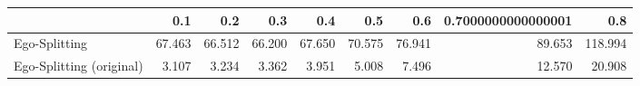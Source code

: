 \begin{tabular}{lrrrrrrrr}
\toprule
{} &    0.1 &    0.2 &    0.3 &    0.4 &    0.5 &    0.6 & 0.7000000000000001 &     0.8 \\
\midrule
Ego-Splitting            & 67.463 & 66.512 & 66.200 & 67.650 & 70.575 & 76.941 &             89.653 & 118.994 \\
Ego-Splitting (original) &  3.107 &  3.234 &  3.362 &  3.951 &  5.008 &  7.496 &             12.570 &  20.908 \\
\bottomrule
\end{tabular}
